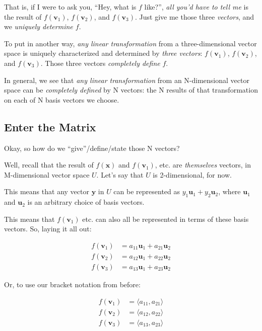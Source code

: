 \documentclass[]{article}
\begin{document}
That is, if I were to ask you, ``Hey, what is \(f\) like?'', \emph{all you'd
have to tell me} is the result of \(f(\mathbf{v}_1)\), \(f(\mathbf{v}_2)\), and
\(f(\mathbf{v}_3)\). Just give me those three \emph{vectors}, and we
\emph{uniquely determine \(f\)}.

To put in another way, \emph{any linear transformation} from a three-dimensional
vector space is uniquely characterized and determined by \emph{three vectors}:
\(f(\mathbf{v}_1)\), \(f(\mathbf{v}_2)\), and \(f(\mathbf{v}_3)\). Those three
vectors \emph{completely define} \(f\).

In general, we see that \emph{any linear transformation} from an N-dimensional
vector space can be \emph{completely defined} by N vectors: the N results of
that transformation on each of N basis vectors we choose.

\hypertarget{enter-the-matrix}{%
\subsection{Enter the Matrix}\label{enter-the-matrix}}

Okay, so how do we ``give''/define/state those N vectors?

Well, recall that the result of \(f(\mathbf{x})\) and \(f(\mathbf{v}_1)\), etc.
are \emph{themselves} vectors, in M-dimensional vector space \(U\). Let's say
that \(U\) is 2-dimensional, for now.

This means that any vector \(\mathbf{y}\) in \(U\) can be represented as
\(y_1 \mathbf{u}_1 + y_2 \mathbf{u}_2\), where \(\mathbf{u}_1\) and
\(\mathbf{u}_2\) is an arbitrary choice of basis vectors.

This means that \(f(\mathbf{v}_1)\) etc. can also all be represented in terms of
these basis vectors. So, laying it all out:

\[
\begin{aligned}
f(\mathbf{v}_1) & = a_{11} \mathbf{u}_1 + a_{21} \mathbf{u}_2 \\
f(\mathbf{v}_2) & = a_{12} \mathbf{u}_1 + a_{22} \mathbf{u}_2 \\
f(\mathbf{v}_3) & = a_{13} \mathbf{u}_1 + a_{23} \mathbf{u}_2
\end{aligned}
\]

Or, to use our bracket notation from before:

\[
\begin{aligned}
f(\mathbf{v}_1) & = \langle a_{11}, a_{21} \rangle \\
f(\mathbf{v}_2) & = \langle a_{12}, a_{22} \rangle \\
f(\mathbf{v}_3) & = \langle a_{13}, a_{23} \rangle
\end{aligned}
\]
\end{document}
